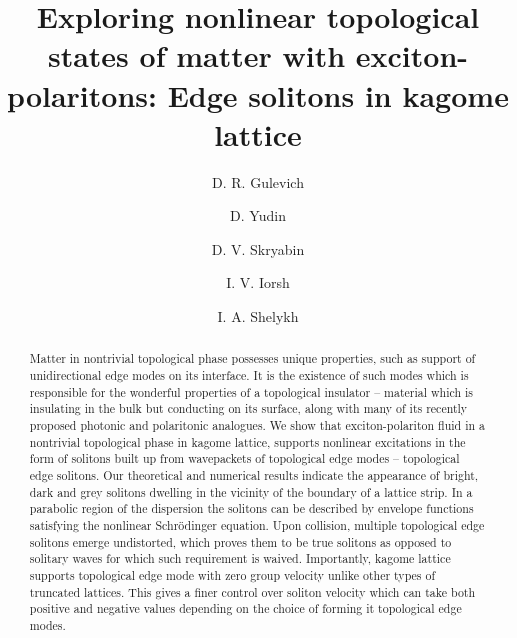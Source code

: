\documentclass[
aps,
prl,
groupedaddress,
superscriptaddress,
floatfix,
notitlepage
]{revtex4-1}
\begin{document}
\title{Exploring nonlinear topological states of matter with exciton-polaritons: Edge solitons in kagome lattice}

\author{D. R. Gulevich} 

\author{D. Yudin} 

\author{D. V. Skryabin} 

\author{I. V. Iorsh} 

\author{I. A. Shelykh} 


\begin{abstract}
Matter in nontrivial topological phase possesses unique properties, such as support of unidirectional edge modes on its interface. It is the existence of such modes which is responsible for the wonderful properties of a topological insulator -- material which is insulating in the bulk but conducting on its surface, along with many of its recently proposed photonic and polaritonic analogues. We show that exciton-polariton fluid in a nontrivial topological phase in kagome lattice, supports nonlinear excitations in the form of solitons built up from wavepackets of topological edge modes -- topological edge solitons. Our theoretical and numerical results indicate the appearance of bright, dark and grey solitons dwelling in the vicinity of the boundary of a lattice strip. In a parabolic region of the dispersion the solitons can be described by envelope functions satisfying the nonlinear Schr\"odinger equation. 
Upon collision, multiple topological edge solitons emerge undistorted, which proves them to be true solitons as opposed to solitary waves for which such requirement is waived. Importantly, kagome lattice supports topological edge mode with zero group velocity unlike other types of truncated lattices. This gives a finer control over soliton velocity which can take both positive and negative values depending on the choice of forming it topological edge modes.
\end{abstract}
\end{document}
